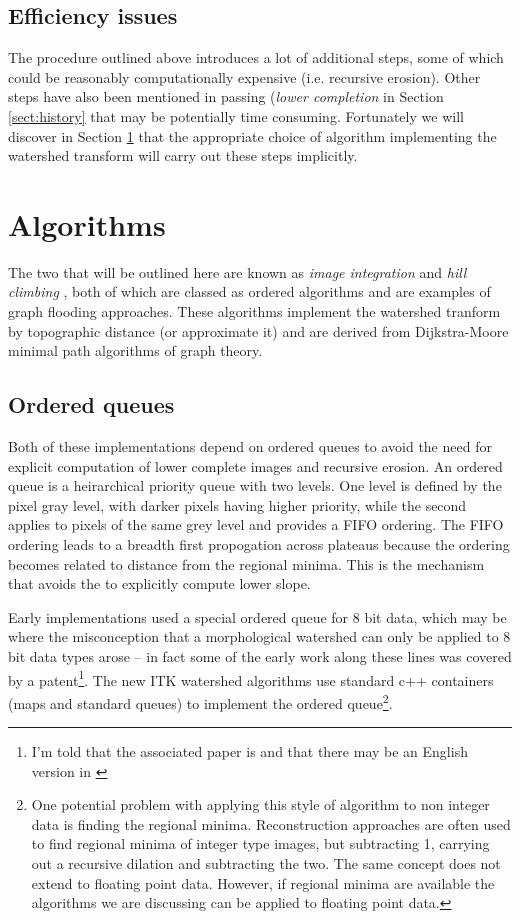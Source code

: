 \documentclass{InsightArticle}
\begin{document}
\subsection{Efficiency issues}
The procedure outlined above introduces a lot of additional steps,
some of which could be reasonably computationally expensive
(i.e. recursive erosion). Other steps have also been mentioned in
passing ({\em lower completion} in Section \ref{sect:history} that may
be potentially time consuming. Fortunately we will discover in Section
\ref{sect:algorithms} that the appropriate choice of algorithm implementing the
watershed transform will carry out these steps implicitly.

\section{Algorithms}
\label{sect:algorithms}
The two that will be outlined here are known as {\em image
integration}\cite{Meyer1994a} and {\em hill climbing}
\cite{Beucher93a}, both of which are classed as ordered
algorithms and are examples of graph flooding approaches. These
algorithms implement the watershed tranform by topographic distance
(or approximate it) and are derived from Dijkstra-Moore minimal path
algorithms of graph theory.

\subsection{Ordered queues}
Both of these implementations depend on ordered queues to avoid the
need for explicit computation of lower complete images and recursive
erosion. An ordered queue is a heirarchical priority queue with two
levels. One level is defined by the pixel gray level, with darker
pixels having higher priority, while the second applies to pixels of
the same grey level and provides a FIFO ordering. The FIFO ordering
leads to a breadth first propogation across plateaus because the
ordering becomes related to distance from the regional minima. This is
the mechanism that avoids the to explicitly compute lower slope.

Early implementations used a special ordered queue for 8 bit data,
which may be where the misconception that a morphological watershed
can only be applied to 8 bit data types arose -- in fact some of the
early work along these lines was covered by a patent\footnote{I'm told
that the associated paper is \cite{Meyer91a} and that there may be an
English version in \cite{Dougherty93a}}. The new ITK watershed
algorithms use standard c++ containers (maps and standard queues) to
implement the ordered queue\footnote{One potential problem with
applying this style of algorithm to non integer data is finding the
regional minima. Reconstruction approaches are often used to find
regional minima of integer type images, but subtracting 1, carrying
out a recursive dilation and subtracting the two. The same concept
does not extend to floating point data. However, if regional minima
are available the algorithms we are discussing can be applied to
floating point data.}.
\end{document}
